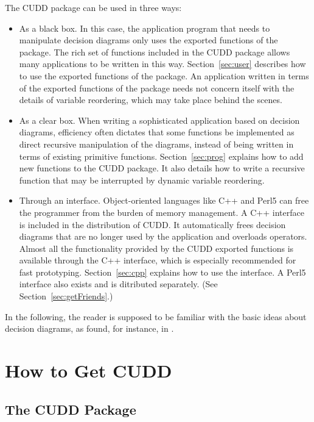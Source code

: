 \documentclass[11pt]{article}
\begin{document}
The CUDD package can be used in three ways:
\begin{itemize}
\item As a black box.  In this case, the application
  program that needs to manipulate decision diagrams only uses the
  exported functions of the package. The rich set of functions
  included in the CUDD package allows many applications to be written
  in this way.  Section~\ref{sec:user} describes how to use the
  exported functions of the package. An application written in terms
  of the exported functions of the package needs not concern itself
  with the details of variable reordering, which may
  take place behind the scenes.
\item As a clear box. When writing a sophisticated
  application based on decision diagrams, efficiency often dictates
  that some functions be implemented as direct recursive manipulation
  of the diagrams, instead of being written in terms of existing
  primitive functions.  Section~\ref{sec:prog} explains how to add new
  functions to the CUDD package. It also details how to write a
  recursive function that may be interrupted by
  dynamic variable reordering.
\item Through an interface. Object-oriented languages like C++ and
  Perl5 can free the programmer from the burden of memory management.
  A C++ interface is included in the distribution of CUDD. It
  automatically frees decision diagrams that are no longer used by the
  application and overloads operators. Almost all the functionality
  provided by the CUDD exported functions is available through the C++
  interface, which is especially recommended for fast prototyping.
  Section~\ref{sec:cpp} explains how to use the interface. A Perl5
  interface also exists and is ditributed separately. (See
  Section~\ref{sec:getFriends}.)
\end{itemize}
In the following, the reader is supposed to be familiar with the basic
ideas about decision diagrams, as found, for instance, in \cite{BBR}.

\section{How to Get CUDD}
\label{sec:getting}

\subsection{The CUDD Package}
\label{sec:getCUDD}
\end{document}
